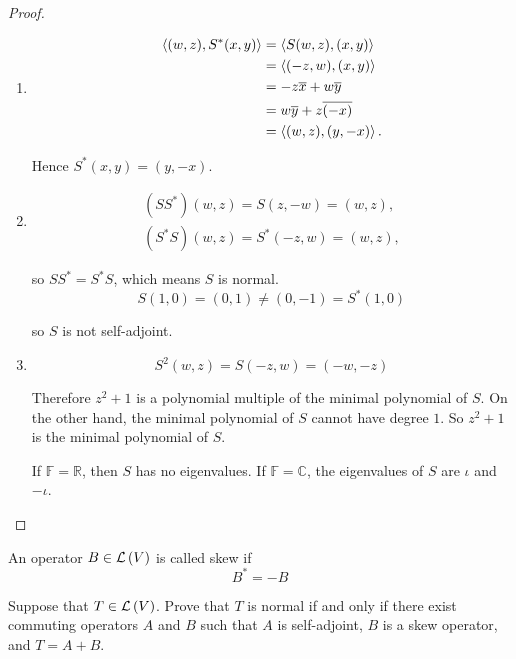 \begin{proof}
    \begin{enumerate}[label={(\alph*)}]
        \item \begin{align*}
            \left\langle{(w, z), S^{*}(x, y)}\right\rangle & = \left\langle{S(w, z), (x, y)}\right\rangle \\
                                            & = \left\langle{(-z, w), (x, y)}\right\rangle \\
                                            & = -z\overline{x} + w\overline{y} \\
                                            & = w\overline{y} + z\overline{(-x)} \\
                                            & = \left\langle{(w, z), (y, -x)}\right\rangle.
        \end{align*}

        Hence $S^{*}(x, y) = (y, -x)$.
        \item \[
            \begin{split}
                (SS^{*})(w, z) = S(z, -w) = (w, z), \\
                (S^{*}S)(w, z) = S^{*}(-z, w) = (w, z),
            \end{split}
        \]

        so $SS^{*} = S^{*}S$, which means $S$ is normal.
        \[
            S(1, 0) = (0, 1) \ne (0, -1) = S^{*}(1, 0)
        \]

        so $S$ is not self-adjoint.
        \item
        \[
            S^{2}(w, z) = S(-z, w) = (-w, -z)
        \]

        Therefore $z^{2} + 1$ is a polynomial multiple of the minimal polynomial of $S$. On the other hand, the minimal polynomial of $S$ cannot have degree $1$. So $z^{2} + 1$ is the minimal polynomial of $S$.

        If $\mathbb{F} = \mathbb{R}$, then $S$ has no eigenvalues. If $\mathbb{F} = \mathbb{C}$, the eigenvalues of $S$ are $\iota$ and $-\iota$.
    \end{enumerate}
\end{proof}
\newpage

\begin{exercise}
    An operator $B\in\mathcal{L}\left({V}\right)$ is called skew if
    \[
        B^{*} = -B
    \]

    Suppose that $T\in\mathcal{L}\left({V}\right)$. Prove that $T$ is normal if and only if there exist commuting operators $A$ and $B$ such that $A$ is self-adjoint, $B$ is a skew operator, and $T = A + B$.
\end{exercise}

